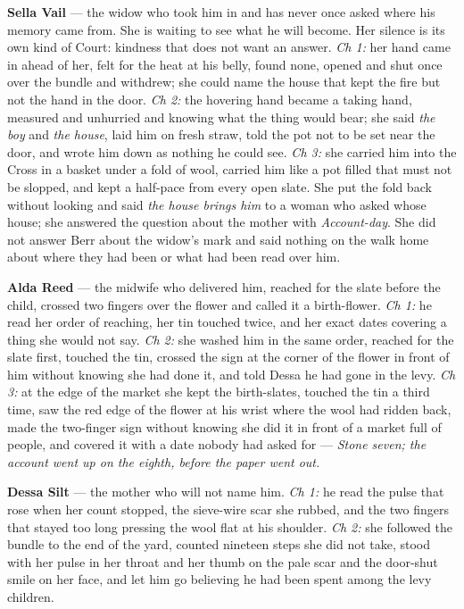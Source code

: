 \documentclass{design/chronicle}
\begin{document}
{\textbf{Sella Vail} — the widow who took him in and has never once asked where his memory came from. She is waiting to see what he will become. Her silence is its own kind of Court: kindness that does not want an answer. \emph{Ch 1:} her hand came in ahead of her, felt for the heat at his belly, found none, opened and shut once over the bundle and withdrew; she could name the house that kept the fire but not the hand in the door. \emph{Ch 2:} the hovering hand became a taking hand, measured and unhurried and knowing what the thing would bear; she said \emph{the boy} and \emph{the house}, laid him on fresh straw, told the pot not to be set near the door, and wrote him down as nothing he could see. \emph{Ch 3:} she carried him into the Cross in a basket under a fold of wool, carried him like a pot filled that must not be slopped, and kept a half-pace from every open slate. She put the fold back without looking and said \emph{the house brings him} to a woman who asked whose house; she answered the question about the mother with \emph{Account-day}. She did not answer Berr about the widow’s mark and said nothing on the walk home about where they had been or what had been read over him.

\textbf{Alda Reed} — the midwife who delivered him, reached for the slate before the child, crossed two fingers over the flower and called it a birth-flower. \emph{Ch 1:} he read her order of reaching, her tin touched twice, and her exact dates covering a thing she would not say. \emph{Ch 2:} she washed him in the same order, reached for the slate first, touched the tin, crossed the sign at the corner of the flower in front of him without knowing she had done it, and told Dessa he had gone in the levy. \emph{Ch 3:} at the edge of the market she kept the birth-slates, touched the tin a third time, saw the red edge of the flower at his wrist where the wool had ridden back, made the two-finger sign without knowing she did it in front of a market full of people, and covered it with a date nobody had asked for --- \emph{Stone seven; the account went up on the eighth, before the paper went out.}

\textbf{Dessa Silt} — the mother who will not name him. \emph{Ch 1:} he read the pulse that rose when her count stopped, the sieve-wire scar she rubbed, and the two fingers that stayed too long pressing the wool flat at his shoulder. \emph{Ch 2:} she followed the bundle to the end of the yard, counted nineteen steps she did not take, stood with her pulse in her throat and her thumb on the pale scar and the door-shut smile on her face, and let him go believing he had been spent among the levy children.

}
\end{document}
